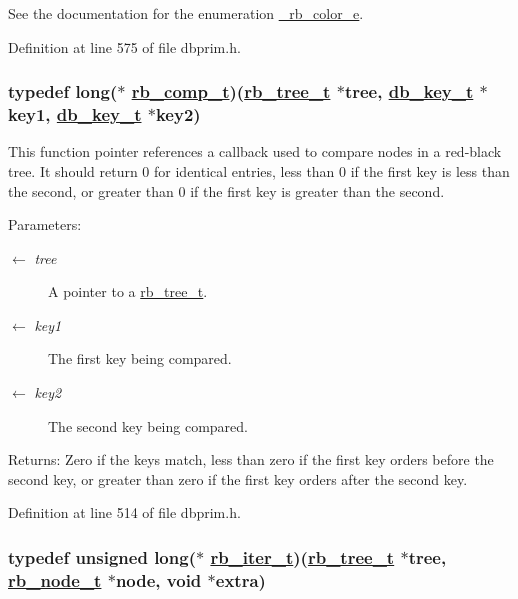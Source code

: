 See the documentation for the enumeration \hyperlink{group__dbprim__rbtree_ga52}{\_\-rb\_\-color\_\-e}.

Definition at line 575 of file dbprim.h.\hypertarget{group__dbprim__rbtree_ga3}{
\subsubsection[rb\_\-comp\_\-t]{\setlength{\rightskip}{0pt plus 5cm}typedef long($\ast$ \hyperlink{group__dbprim__rbtree_ga3}{rb\_\-comp\_\-t})(\hyperlink{struct__rb__tree__s}{rb\_\-tree\_\-t} $\ast$tree, \hyperlink{struct__db__key__s}{db\_\-key\_\-t} $\ast$key1, \hyperlink{struct__db__key__s}{db\_\-key\_\-t} $\ast$key2)}}
\label{group__dbprim__rbtree_ga3}


This function pointer references a callback used to compare nodes in a red-black tree. It should return 0 for identical entries, less than 0 if the first key is less than the second, or greater than 0 if the first key is greater than the second.

\begin{Desc}
\item[Parameters:]
\begin{description}
\item[\mbox{$\leftarrow$} {\em tree}]A pointer to a \hyperlink{group__dbprim__rbtree_ga0}{rb\_\-tree\_\-t}. \item[\mbox{$\leftarrow$} {\em key1}]The first key being compared. \item[\mbox{$\leftarrow$} {\em key2}]The second key being compared.\end{description}
\end{Desc}
\begin{Desc}
\item[Returns:]Zero if the keys match, less than zero if the first key orders before the second key, or greater than zero if the first key orders after the second key.\end{Desc}


Definition at line 514 of file dbprim.h.\hypertarget{group__dbprim__rbtree_ga2}{
\subsubsection[rb\_\-iter\_\-t]{\setlength{\rightskip}{0pt plus 5cm}typedef unsigned long($\ast$ \hyperlink{group__dbprim__rbtree_ga2}{rb\_\-iter\_\-t})(\hyperlink{struct__rb__tree__s}{rb\_\-tree\_\-t} $\ast$tree, \hyperlink{struct__rb__node__s}{rb\_\-node\_\-t} $\ast$node, void $\ast$extra)}}
\label{group__dbprim__rbtree_ga2}


